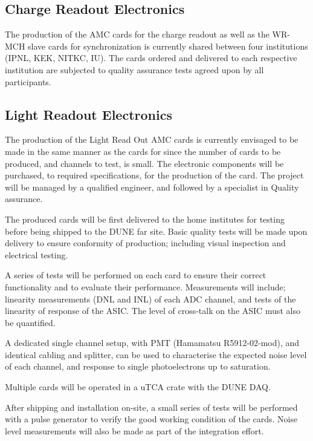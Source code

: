 \subsection{Charge Readout Electronics}
\label{sec:fddp-tpc-elec-prod-cro}
The production of the AMC cards for the charge readout as well as the WR-MCH slave cards for synchronization is currently shared between four institutions (IPNL, KEK, NITKC, IU). The cards ordered and delivered to each respective institution are subjected to quality assurance tests agreed upon by all participants.  

\subsection{Light Readout Electronics}
\label{sec:fddp-tpc-elec-prod-lro}

The production of the Light Read Out AMC cards is currently envisaged to be made in the same manner as the cards for  since the number of cards to be produced, and channels to test, is small. The electronic components will be purchased, to required specifications, for the production of the card. The project will be managed by a qualified engineer, and followed by a specialist in Quality assurance.

The produced cards will be first delivered to the home institutes for testing before being shipped to the DUNE far site.  Basic quality tests will be made upon delivery to ensure conformity of production; including visual inspection and electrical testing.

A series of tests will be performed on each card to ensure their correct functionality and to evaluate their performance. Measurements will include; linearity measurements (DNL and INL) of each ADC channel, and tests of the linearity of response of the ASIC. The level of cross-talk on the ASIC must also be quantified.

A dedicated single channel setup, with PMT (Hamamatsu R5912-02-mod), and identical cabling and splitter, can be used to characterise the expected noise level of each channel, and response to single photoelectrons up to saturation. 

Multiple cards will be operated in a uTCA crate with the DUNE DAQ.

After shipping and installation on-site, a small series of tests will be performed with a pulse generator to verify the good working condition of the cards. Noise level measurements will also be made as part of the integration effort.

